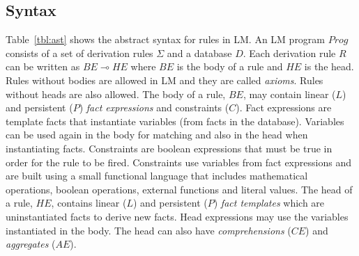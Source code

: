 \documentclass{sigplanconf}
\newcommand{\lolli}{\multimap}
\begin{document}
\subsection{Syntax}

Table~\ref{tbl:ast} shows the abstract syntax for rules in LM.  An LM
program $Prog$ consists of a set of derivation rules $\Sigma$ and a
database $D$.  Each derivation rule $R$ can be written as $BE \lolli
HE$ where $BE$ is the body of a rule and $HE$ is the head. Rules
without bodies are allowed in LM and they are called
\textit{axioms}. Rules without heads are also allowed.  The body of a
rule, $BE$, may contain linear ($L$) and persistent ($P$) \emph{fact
  expressions} and constraints ($C$). Fact expressions are template
facts that instantiate variables (from facts in the
database). Variables can be used again in the body for matching and
also in the head when instantiating facts. Constraints are boolean
expressions that must be true in order for the rule to be
fired. Constraints use variables from fact expressions and are built
using a small functional language that includes mathematical
operations, boolean operations, external functions and literal values.
The head of a rule, $HE$, contains linear ($L$) and persistent ($P$)
\emph{fact templates} which are uninstantiated facts to derive new
facts. Head expressions may use the variables instantiated in the
body. The head can also have \emph{comprehensions} ($CE$) and
\emph{aggregates} ($AE$).
\end{document}
